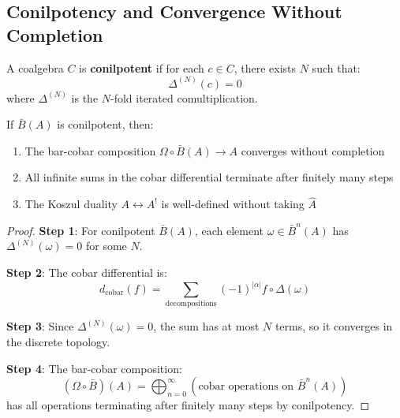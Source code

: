 \subsection{Conilpotency and Convergence Without Completion}
\label{sec:conilpotency-convergence}

\begin{definition}
\label{def:conilpotent-complete}
A coalgebra $C$ is \textbf{conilpotent} if for each $c \in C$, there exists $N$ such that:
\begin{equation}
\Delta^{(N)}(c) = 0
\end{equation}
where $\Delta^{(N)}$ is the $N$-fold iterated comultiplication.
\end{definition}

\begin{theorem}
\label{thm:conilpotency-convergence}
If $\bar{B}(A)$ is conilpotent, then:
\begin{enumerate}
\item The bar-cobar composition $\Omega \circ \bar{B}(A) \to A$ converges without completion
\item All infinite sums in the cobar differential terminate after finitely many steps
\item The Koszul duality $A \leftrightarrow A^!$ is well-defined without taking $\hat{A}$
\end{enumerate}
\end{theorem}

\begin{proof}
\textbf{Step 1}: For conilpotent $\bar{B}(A)$, each element $\omega \in \bar{B}^n(A)$ 
has $\Delta^{(N)}(\omega) = 0$ for some $N$.

\textbf{Step 2}: The cobar differential is:
\begin{equation}
d_{\text{cobar}}(f) = \sum_{\text{decompositions}} (-1)^{|\alpha|} f \circ \Delta(\omega)
\end{equation}

\textbf{Step 3}: Since $\Delta^{(N)}(\omega) = 0$, the sum has at most $N$ terms, so 
it converges in the discrete topology.

\textbf{Step 4}: The bar-cobar composition:
\begin{equation}
(\Omega \circ \bar{B})(A) = \bigoplus_{n=0}^\infty (\text{cobar operations on } 
\bar{B}^n(A))
\end{equation}
has all operations terminating after finitely many steps by conilpotency.
\end{proof}

